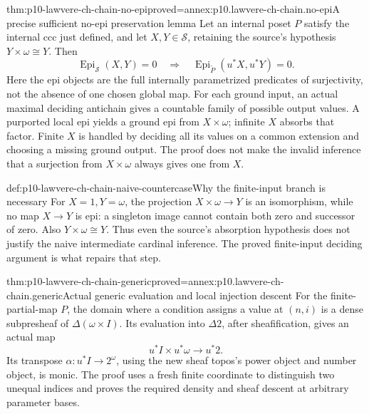 \begin{hbtheorem}{thm:p10-lawvere-ch-chain-no-epi}{proved=annex:p10.lawvere-ch-chain.no-epi}{A precise sufficient no-epi preservation lemma}
Let an internal poset \(P\) satisfy the internal ccc just defined, and
let \(X,Y\in\mathcal S\), retaining the source's hypothesis
\(Y\times\omega\cong Y\). Then
\[
 \operatorname{Epi}_{\mathcal S}(X,Y)=0
 \quad\Longrightarrow\quad
 \operatorname{Epi}_{\widetilde P}(u^*X,u^*Y)=0.
\]
Here the epi objects are the full internally parametrized predicates of
surjectivity, not the absence of one chosen global map. For each ground
input, an actual maximal deciding antichain gives a countable family of
possible output values. A purported local epi yields a ground epi from
\(X\times\omega\); infinite \(X\) absorbs that factor. Finite \(X\)
is handled by deciding all its values on a common extension and choosing
a missing ground output. The proof does not make the invalid inference
that a surjection from \(X\times\omega\) always gives one from \(X\).
\end{hbtheorem}

\begin{hbexample}{def:p10-lawvere-ch-chain-naive-countercase}{Why the finite-input branch is necessary}
For \(X=1,Y=\omega\), the projection \(X\times\omega\to Y\) is
an isomorphism, while no map \(X\to Y\) is epi: a singleton image
cannot contain both zero and successor of zero. Also
\(Y\times\omega\cong Y\). Thus even the source's absorption
hypothesis does not justify the naive intermediate cardinal inference.
The proved finite-input deciding argument is what repairs that step.
\end{hbexample}

\begin{hbtheorem}{thm:p10-lawvere-ch-chain-generic}{proved=annex:p10.lawvere-ch-chain.generic}{Actual generic evaluation and local injection descent}
For the finite-partial-map \(P\), the domain where a condition assigns a
value at \((n,i)\) is a dense subpresheaf of \(\Delta(\omega\times I)\).
Its evaluation into \(\Delta2\), after sheafification, gives an actual map
\[
 u^*I\times u^*\omega\longrightarrow u^*2.
\]
Its transpose \(\alpha:u^*I\to2^\omega\), using the new sheaf topos's
power object and number object, is monic. The proof uses a fresh finite
coordinate to distinguish two unequal indices and proves the required
density and sheaf descent at arbitrary parameter bases.
\end{hbtheorem}

